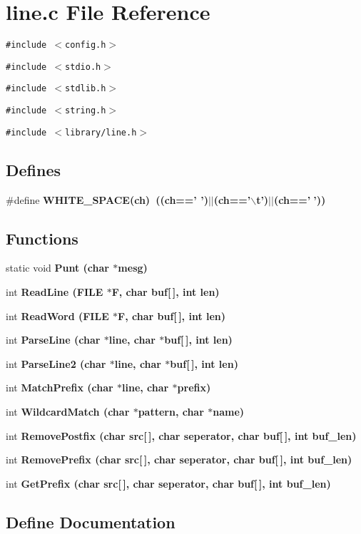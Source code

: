 \section{line.c File Reference}
\label{line_8c}
{\tt \#include $<$config.h$>$}\par
{\tt \#include $<$stdio.h$>$}\par
{\tt \#include $<$stdlib.h$>$}\par
{\tt \#include $<$string.h$>$}\par
{\tt \#include $<$library/line.h$>$}\par
\subsection*{Defines}
\begin{CompactItemize}
\item 
\#define \bf{WHITE\_\-SPACE}(ch)~((ch==' ')$|$$|$(ch=='$\backslash$t')$|$$|$(ch==''))
\end{CompactItemize}
\subsection*{Functions}
\begin{CompactItemize}
\item 
static void \bf{Punt} (char $\ast$mesg)
\item 
int \bf{Read\-Line} (FILE $\ast$\bf{F}, char buf[$\,$], int len)
\item 
int \bf{Read\-Word} (FILE $\ast$\bf{F}, char buf[$\,$], int len)
\item 
int \bf{Parse\-Line} (char $\ast$line, char $\ast$buf[$\,$], int len)
\item 
int \bf{Parse\-Line2} (char $\ast$line, char $\ast$buf[$\,$], int len)
\item 
int \bf{Match\-Prefix} (char $\ast$line, char $\ast$prefix)
\item 
int \bf{Wildcard\-Match} (char $\ast$pattern, char $\ast$\bf{name})
\item 
int \bf{Remove\-Postfix} (char src[$\,$], char seperator, char buf[$\,$], int buf\_\-len)
\item 
int \bf{Remove\-Prefix} (char src[$\,$], char seperator, char buf[$\,$], int buf\_\-len)
\item 
int \bf{Get\-Prefix} (char src[$\,$], char seperator, char buf[$\,$], int buf\_\-len)
\end{CompactItemize}


\subsection{Define Documentation}
